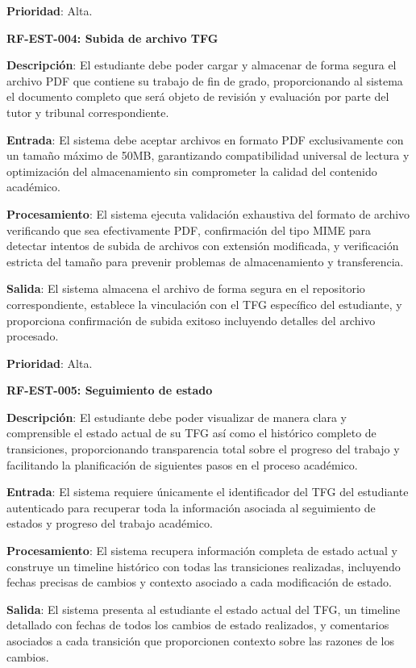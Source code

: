\documentclass[12pt,a4paper,oneside]{report}
\begin{document}
\textbf{Prioridad}: Alta.

\textbf{RF-EST-004: Subida de archivo TFG}

\textbf{Descripción}: El estudiante debe poder cargar y almacenar de forma segura el archivo PDF que contiene su trabajo de fin de grado, proporcionando al sistema el documento completo que será objeto de revisión y evaluación por parte del tutor y tribunal correspondiente.

\textbf{Entrada}: El sistema debe aceptar archivos en formato PDF exclusivamente con un tamaño máximo de 50MB, garantizando compatibilidad universal de lectura y optimización del almacenamiento sin comprometer la calidad del contenido académico.

\textbf{Procesamiento}: El sistema ejecuta validación exhaustiva del formato de archivo verificando que sea efectivamente PDF, confirmación del tipo MIME para detectar intentos de subida de archivos con extensión modificada, y verificación estricta del tamaño para prevenir problemas de almacenamiento y transferencia.

\textbf{Salida}: El sistema almacena el archivo de forma segura en el repositorio correspondiente, establece la vinculación con el TFG específico del estudiante, y proporciona confirmación de subida exitoso incluyendo detalles del archivo procesado.

\textbf{Prioridad}: Alta.

\textbf{RF-EST-005: Seguimiento de estado}

\textbf{Descripción}: El estudiante debe poder visualizar de manera clara y comprensible el estado actual de su TFG así como el histórico completo de transiciones, proporcionando transparencia total sobre el progreso del trabajo y facilitando la planificación de siguientes pasos en el proceso académico.

\textbf{Entrada}: El sistema requiere únicamente el identificador del TFG del estudiante autenticado para recuperar toda la información asociada al seguimiento de estados y progreso del trabajo académico.

\textbf{Procesamiento}: El sistema recupera información completa de estado actual y construye un timeline histórico con todas las transiciones realizadas, incluyendo fechas precisas de cambios y contexto asociado a cada modificación de estado.

\textbf{Salida}: El sistema presenta al estudiante el estado actual del TFG, un timeline detallado con fechas de todos los cambios de estado realizados, y comentarios asociados a cada transición que proporcionen contexto sobre las razones de los cambios.
\end{document}
